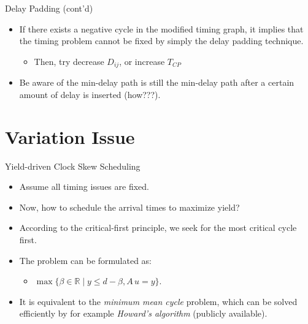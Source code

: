 \documentclass[10pt,ignorenonframetext,mathserif]{beamer}
\providecommand{\tightlist}{%
  \setlength{\itemsep}{0pt}\setlength{\parskip}{0pt}}
\begin{document}
\begin{frame}{Delay Padding (cont'd)}

\begin{itemize}
\tightlist
\item
  If there exists a negative cycle in the modified timing graph, it
  implies that the timing problem cannot be fixed by simply the delay
  padding technique.

  \begin{itemize}
  \tightlist
  \item
    Then, try decrease \(D_{ij}\), or increase \(T_{CP}\)
  \end{itemize}
\item
  Be aware of the min-delay path is still the min-delay path after a
  certain amount of delay is inserted (how???).
\end{itemize}

\end{frame}

\section{Variation Issue}\label{variation-issue}

\begin{frame}{Yield-driven Clock Skew Scheduling}

\begin{itemize}
\tightlist
\item
  Assume all timing issues are fixed.
\item
  Now, how to schedule the arrival times to maximize yield?
\item
  According to the critical-first principle, we seek for the most
  critical cycle first.
\item
  The problem can be formulated as:

  \begin{itemize}
  \tightlist
  \item
    \(\max\{\beta \in \mathbb{R} \mid y \leq d - \beta, A\,u = y\}\).
  \end{itemize}
\item
  It is equivalent to the \emph{minimum mean cycle} problem, which can
  be solved efficiently by for example \emph{Howard's algorithm}
  (publicly available).
\end{itemize}

\end{frame}
\end{document}
